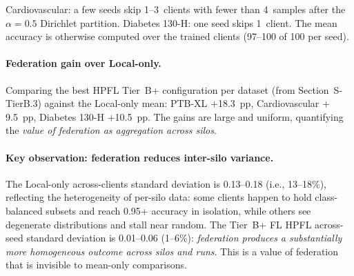 \documentclass[conference]{IEEEtran}
\begin{document}
\begin{table}[htbp]
\centering
\caption{Local-only baseline (no aggregation): per-seed breakdown of the across-clients mean accuracy on the three Tier~B+ datasets. The last row is the mean over 5~seeds. The right column reports the mean across-clients standard deviation, which is large (0.13--0.18) because some clients hold class-rich subsets while others see degenerate distributions.}
\label{tab:tier_b_local}
\small
\setlength{\tabcolsep}{5pt}

\vspace{1mm}
\footnotesize{Cardiovascular: a few seeds skip 1--3~clients with fewer than 4~samples after the $\alpha{=}0.5$ Dirichlet partition. Diabetes 130-H: one seed skips 1~client. The mean accuracy is otherwise computed over the trained clients (97--100 of 100 per seed).}
\end{table}

\paragraph{Federation gain over Local-only.} Comparing the best HPFL Tier~B+ configuration per dataset (from Section~S-TierB.3) against the Local-only mean: PTB-XL $+$18.3~pp, Cardiovascular $+$9.5~pp, Diabetes 130-H $+$10.5~pp. The gains are large and uniform, quantifying the \emph{value of federation as aggregation across silos}.

\paragraph{Key observation: federation reduces inter-silo variance.} The Local-only across-clients standard deviation is 0.13--0.18 (i.e., 13--18\%), reflecting the heterogeneity of per-silo data: some clients happen to hold class-balanced subsets and reach 0.95+ accuracy in isolation, while others see degenerate distributions and stall near random. The Tier~B+ FL HPFL across-seed standard deviation is 0.01--0.06 (1--6\%): \emph{federation produces a substantially more homogeneous outcome across silos and runs}. This is a value of federation that is invisible to mean-only comparisons.
\end{document}
